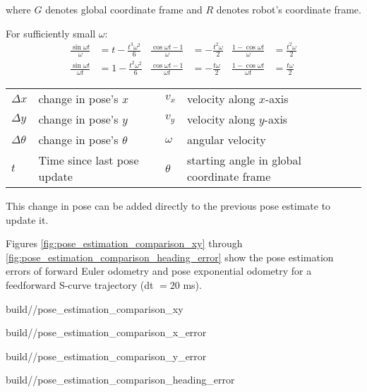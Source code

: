 \begin{theorem}
  where $G$ denotes global coordinate frame and $R$ denotes robot's coordinate
  frame.

  For sufficiently small $\omega$:
  \begin{align}
    \frac{\sin\omega t}{\omega} &= t - \frac{t^3 \omega^2}{6} &
    \frac{\cos\omega t - 1}{\omega} &= -\frac{t^2 \omega}{2} &
    \frac{1 - \cos\omega t}{\omega} &= \frac{t^2 \omega}{2} \\
    \frac{\sin\omega t}{\omega t} &= 1 - \frac{t^2 \omega^2}{6} &
    \frac{\cos\omega t - 1}{\omega t} &= -\frac{t \omega}{2} &
    \frac{1 - \cos\omega t}{\omega t} &= \frac{t \omega}{2}
  \end{align}
  \begin{figurekey}
    \begin{tabular}{llll}
      $\Delta x$ & change in pose's $x$ & $v_x$ & velocity along $x$-axis \\
      $\Delta y$ & change in pose's $y$ & $v_y$ & velocity along $y$-axis \\
      $\Delta \theta$ & change in pose's $\theta$ & $\omega$ & angular velocity
        \\
      $t$ & Time since last pose update & $\theta$ & starting angle in global
        coordinate frame
    \end{tabular}
  \end{figurekey}

  This change in pose can be added directly to the previous pose estimate to
  update it.
\end{theorem}

Figures \ref{fig:pose_estimation_comparison_xy} through
\ref{fig:pose_estimation_comparison_heading_error} show the pose estimation
errors of forward Euler odometry and pose exponential odometry for a feedforward
S-curve trajectory (dt $= 20$ ms).
\begin{bookfigure}
  \begin{minisvg}{2}{build/\chapterpath/pose_estimation_comparison_xy}
    \caption{Pose estimation comparison\\(y vs x)}
    \label{fig:pose_estimation_comparison_xy}
  \end{minisvg}
  \hfill
  \begin{minisvg}{2}{build/\chapterpath/pose_estimation_comparison_x_error}
    \caption{Pose estimation  comparison\\(x error vs time)}
  \end{minisvg}
\end{bookfigure}
\begin{bookfigure}
  \begin{minisvg}{2}{build/\chapterpath/pose_estimation_comparison_y_error}
    \caption{Pose estimation comparison\\(y error vs time)}
  \end{minisvg}
  \begin{minisvg}{2}{build/\chapterpath/pose_estimation_comparison_heading_error}
    \caption{Pose estimation comparison\\(heading error vs time)}
    \label{fig:pose_estimation_comparison_heading_error}
  \end{minisvg}
\end{bookfigure}

